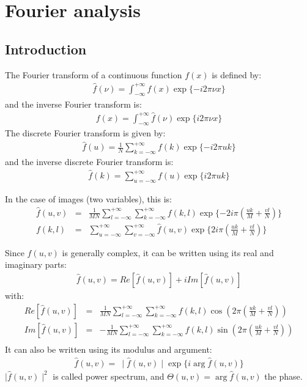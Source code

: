 \newpage
\section{Fourier analysis}
\subsection{Introduction}
The Fourier transform of a continuous function $f(x)$ is defined by:
\begin{eqnarray}
\hat{f}(\nu) = \int_{-\infty}^{+\infty} f(x) \exp\{-i 2\pi \nu x\}
\end{eqnarray}
and the inverse Fourier transform is:
\begin{eqnarray}
f(x) = \int_{-\infty}^{+\infty}  \hat{f}(\nu) \exp\{i 2\pi \nu x\}
\end{eqnarray}
The discrete Fourier transform is given by:
\begin{eqnarray}
\hat{f}(u) = \frac{1}{N} \sum_{k=-\infty}^{+\infty} f(k) \exp\{-i 2\pi u k\}
\end{eqnarray}
and the inverse discrete Fourier transform is:
\begin{eqnarray}
\hat{f}(k) =  \sum_{u=-\infty}^{+\infty} f(u) \exp\{i 2\pi u k\}
\end{eqnarray}

In the case of images (two variables), this is:
\begin{eqnarray}
\hat{f}(u,v) & = & \frac{1}{MN} \sum_{l=-\infty}^{+\infty}
\sum_{k=-\infty}^{+\infty} f(k,l) \exp\{-2i\pi (\frac{u k}{M} + \frac{vl}{N} )\} \\
f(k,l) & = &  \sum_{u=-\infty}^{+\infty}
\sum_{v=-\infty}^{+\infty} \hat{f}(u,v) \exp\{2i \pi (\frac{u k}{M} + \frac{vl}{N} )\}
\end{eqnarray}

Since $\hat{f}(u,v)$ is generally complex, it can be written using its
real and imaginary parts:
\begin{eqnarray}
\hat{f}(u,v) = Re[\hat{f}(u,v)] + i Im[\hat{f}(u,v)]
\end{eqnarray}
with:
\begin{eqnarray}
Re[\hat{f}(u,v)] & = & \frac{1}{MN} \sum_{l=-\infty}^{+\infty}
\sum_{k=-\infty}^{+\infty} f(k,l)   \cos(2\pi (\frac{u k}{M} + \frac{vl}{N} ))  \\
Im[\hat{f}(u,v)] & = & - \frac{1}{MN} \sum_{l=-\infty}^{+\infty}
\sum_{k=-\infty}^{+\infty} f(k,l)  \sin(2\pi (\frac{u k}{M} + \frac{vl}{N} ))  \\
\end{eqnarray}
It can also be written using its modulus and argument:
\begin{eqnarray}
\hat{f}(u,v) = \  \mid \hat{f}(u,v) \mid  \exp\{ i \arg{\hat{f}(u,v)}\}
\end{eqnarray}
$\mid \hat{f}(u,v) \mid^2$ is called power spectrum, and 
$\Theta(u,v) = \arg{\hat{f}(u,v)}$ the phase.

